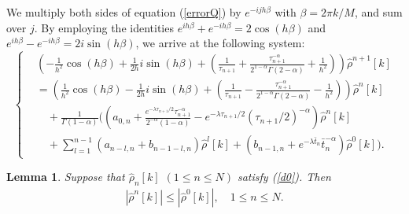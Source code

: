 \documentclass[10pt, reqno]{amsart}
\newtheorem{lmm}{\bf Lemma}
\newenvironment{lemma}{\begin{lmm}}{\end{lmm}}
\theoremstyle{remark}
\theoremstyle{definition}
\numberwithin{table}{section}
\begin{document}
We multiply both sides of equation (\ref{errorQ}) by $e^{-ijh\beta}$  with $\beta = 2\pi k/M$, and sum over $j$. By employing the identities $e^{ih\beta}+e^{-ih\beta}=2\cos(h\beta)$ and $e^{ih\beta}-e^{-ih\beta}=2i\sin(h\beta)$, we arrive at the following system:
\begin{equation}\label{d0}
\left\{
\begin{aligned}
    &(-\frac{1}{h^2}\cos(h\beta)+\frac{1}{2h}i\sin(h\beta)+(\frac{1}{\tau_{n+1}}+\frac{\tau_{n+1}^{-\alpha}}{2^{1-\alpha}\Gamma(2-\alpha)}+\frac{1}{h^2}) )\hat{\rho}^{n+1}[k] \\
    &=(\frac{1}{h^2}\cos(h\beta)-\frac{1}{2h}i\sin(h\beta)+(\frac{1}{\tau_{n+1}}-\frac{\tau_{n+1}^{-\alpha}}{2^{1-\alpha}\Gamma(2-\alpha)}-\frac{1}{h^2}) )\hat{\rho}^{n}[k] \\
    &\quad +\frac{1}{\Gamma(1-\alpha)}((a_{0, n} +\frac{e^{-\lambda {\tau_{n+1}}/{2}}\tau_{n+1}^{-\alpha}}{2^{-\alpha}(1-\alpha)}-e^{-\lambda {\tau_{n+1}}/{2}} ({\tau_{n+1}}/{2})^{-\alpha})\hat{\rho}^{n}[k]\\
    &\quad +\sum\limits_{l=1}^{n-1} (a_{n-l, n}+b_{n-1-l, n}) \hat{\rho}^{l}[k]+(b_{n-1, n}+{e^{-\lambda \bar{t}_n}}{\bar{t}_n^{-\alpha}}) \hat{\rho}^{0}[k]).
\end{aligned}
\right.
\end{equation}
\begin{lemma}\label{dnd0}
    Suppose that $\hat{\rho}_{n}[k]$ $ (1\le n\le N)$ satisfy (\ref{d0}).  Then 
    \begin{align}
    |\hat{\rho}^{n}[k]|\leq |\hat{\rho}^{0}[k]|,\quad 1\le n\le N.\label{rho1}
    \end{align}
\end{lemma}
\end{document}
